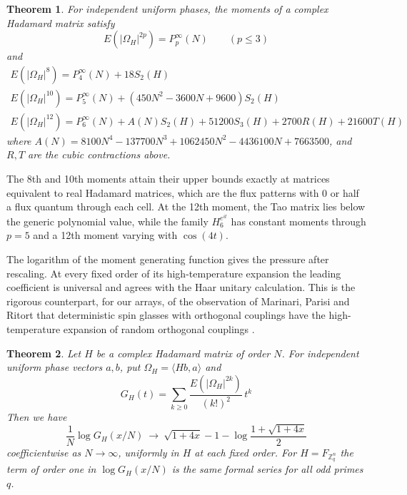 \documentclass[11pt,a4paper]{article}
\newtheorem{introthm}{Theorem}
\theoremstyle{remark}
\begin{document}
\begin{samepage}
\begin{introthm}\label{intro:moments}
For independent uniform phases, the moments of a complex Hadamard matrix satisfy
\[
 E(|\Omega_H|^{2p})=P^\infty_p(N)\qquad(p\le3)
\]
and
\[
\begin{gathered}
 E(|\Omega_H|^8)=P^\infty_4(N)+18S_2(H)\\[5pt]
 E(|\Omega_H|^{10})=P^\infty_5(N)+(450N^2-3600N+9600)S_2(H)\\[5pt]
 E(|\Omega_H|^{12})=P^\infty_6(N)+A(N)S_2(H)+51200S_3(H)+2700R(H)+21600T(H)
\end{gathered}
\]
where $A(N)=8100N^4-137700N^3+1062450N^2-4436100N+7663500$, and $R,T$ are the cubic contractions above.
\end{introthm}
\end{samepage}

The 8th and 10th moments attain their upper bounds exactly at matrices equivalent to real Hadamard matrices, which are the flux patterns with 0 or half a flux quantum through each cell. At the 12th moment, the Tao matrix lies below the generic polynomial value, while the family $H_6^{e^{it}}$ has constant moments through $p=5$ and a 12th moment varying with $\cos(4t)$.

The logarithm of the moment generating function gives the pressure after rescaling. At every fixed order of its high-temperature expansion the leading coefficient is universal and agrees with the Haar unitary calculation. This is the rigorous counterpart, for our arrays, of the observation of Marinari, Parisi and Ritort that deterministic spin glasses with orthogonal couplings have the high-temperature expansion of random orthogonal couplings \cite{mp1,mp2,ppo}.

\begin{samepage}
\begin{introthm}\label{intro:free}
Let $H$ be a complex Hadamard matrix of order $N$. For independent
uniform phase vectors $a,b$, put $\Omega_H=\langle Hb,a\rangle$ and
\[
 G_H(t)=\sum_{k\geq0}\frac{E(|\Omega_H|^{2k})}{(k!)^2}\,t^k
\]
Then we have
\[
 \frac{1}{N}\log G_H(x/N)\ \longrightarrow\
 \sqrt{1+4x}-1-\log\frac{1+\sqrt{1+4x}}2
\]
coefficientwise as $N\to\infty$, uniformly in $H$ at each fixed order.
For $H=F_{\mathbb Z_q^n}$ the term of order one in $\log G_H(x/N)$ is
the same formal series for all odd primes $q$.
\end{introthm}
\end{samepage}
\end{document}
